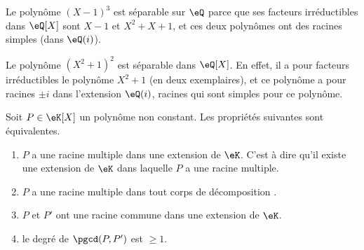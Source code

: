 \begin{example}
    Le polynôme \( (X-1)^3\) est séparable sur \( \eQ\) parce que ses facteurs irréductibles dans \( \eQ[X]\) sont \( X-1\) et \(X^2 + X + 1\), et ces deux polynômes ont des racines simples (dans \( \eQ(i)\)).
\end{example}

\begin{example}
    Le polynôme \( (X^2+1)^2\) est séparable dans \( \eQ[X]\). En effet, il a pour facteurs irréductibles le polynôme \( X^2+1\) (en deux exemplaires), et ce polynôme a pour racines \( \pm i\) dans l'extension \( \eQ(i)\), racines qui sont simples pour ce polynôme.
\end{example}

\begin{proposition}  \label{PropolyeZff}
    Soit \( P\in \eK[X]\) un polynôme non constant. Les propriétés suivantes sont équivalentes.
    \begin{enumerate}
        \item\label{ItemdqPFUi}
            \( P\) a une racine multiple dans une extension de \( \eK\). C'est à dire qu'il existe une extension de \( \eK\) dans laquelle \( P\) a une racine multiple.
        \item\label{ItemdqPFUib}
            \( P\) a une racine multiple dans tout corps de décomposition .
        \item\label{ItemdqPFUii}
            \( P\) et \( P'\) ont une racine commune dans une extension de \( \eK\).
        \item\label{ItemdqPFUiii}
            le degré de \( \pgcd(P,P')\) est \( \geq 1\).
    \end{enumerate}
\end{proposition}

